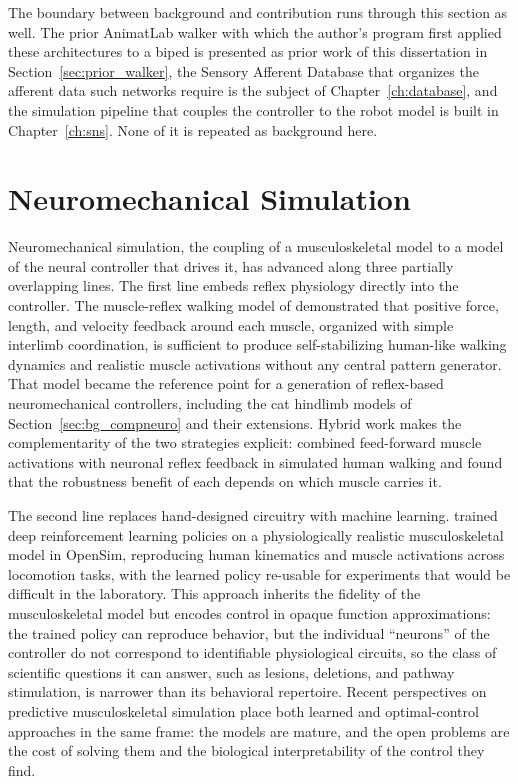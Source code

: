 The boundary between background and contribution runs through this section as well. The prior AnimatLab walker with which the author's program first applied these architectures to a biped \citep{bolen_design_2020} is presented as prior work of this dissertation in Section~\ref{sec:prior_walker}, the Sensory Afferent Database that organizes the afferent data such networks require \citep{bolen_sensory_2023} is the subject of Chapter~\ref{ch:database}, and the simulation pipeline that couples the controller to the robot model is built in Chapter~\ref{ch:sns}. None of it is repeated as background here.

\section{Neuromechanical Simulation}\label{sec:bg_neuromech}

Neuromechanical simulation, the coupling of a musculoskeletal model to a model of the neural controller that drives it, has advanced along three partially overlapping lines. The first line embeds reflex physiology directly into the controller. The muscle-reflex walking model of \citet{geyer_musclereflex_2010} demonstrated that positive force, length, and velocity feedback around each muscle, organized with simple interlimb coordination, is sufficient to produce self-stabilizing human-like walking dynamics and realistic muscle activations without any central pattern generator. That model became the reference point for a generation of reflex-based neuromechanical controllers, including the cat hindlimb models of Section~\ref{sec:bg_compneuro} \citep{markin_afferent_2010, shevtsova_modeling_2016} and their extensions. Hybrid work makes the complementarity of the two strategies explicit: \citet{haeufle_benefit_2018} combined feed-forward muscle activations with neuronal reflex feedback in simulated human walking and found that the robustness benefit of each depends on which muscle carries it.

The second line replaces hand-designed circuitry with machine learning. \citet{song_deep_2021} trained deep reinforcement learning policies on a physiologically realistic musculoskeletal model in OpenSim, reproducing human kinematics and muscle activations across locomotion tasks, with the learned policy re-usable for experiments that would be difficult in the laboratory. This approach inherits the fidelity of the musculoskeletal model but encodes control in opaque function approximations: the trained policy can reproduce behavior, but the individual ``neurons'' of the controller do not correspond to identifiable physiological circuits, so the class of scientific questions it can answer, such as lesions, deletions, and pathway stimulation, is narrower than its behavioral repertoire. Recent perspectives on predictive musculoskeletal simulation \citep{degroote_perspective_2021} place both learned and optimal-control approaches in the same frame: the models are mature, and the open problems are the cost of solving them and the biological interpretability of the control they find.

